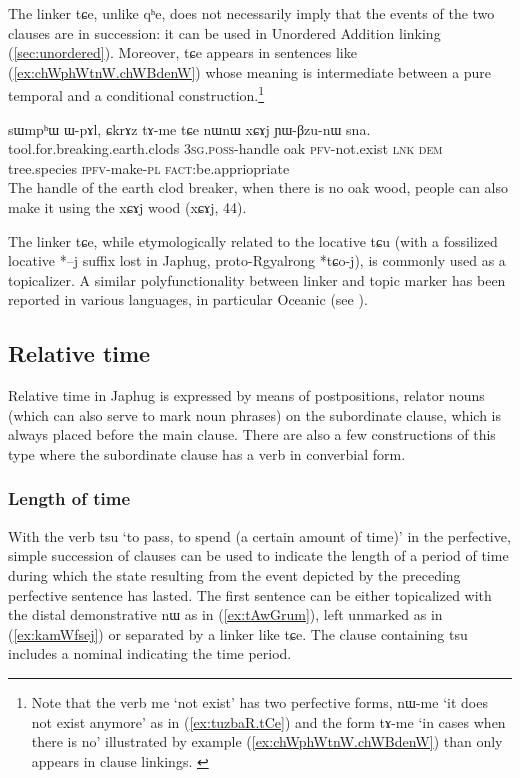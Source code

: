 \documentclass[oldfontcommands,oneside,a4paper,11pt]{article}
\newcommand{\ipa}[1]{{\phon \mbox{#1}}} %
\newcommand{\refb}[1]{(\ref{#1})}
\begin{document}
 The linker \ipa{tɕe}, unlike \ipa{qʰe},  does not necessarily imply that the events of the two clauses are in succession: it can be used in Unordered Addition linking \refb{sec:unordered}. Moreover,  \ipa{tɕe}  appears in sentences like \refb{ex:chWphWtnW.chWBdenW} whose meaning is intermediate between a pure temporal and a conditional construction.\footnote{Note that the verb \ipa{me} `not exist' has two perfective forms,  \ipa{nɯ-me} `it does not exist anymore' as in \refb{ex:tuzbaR.tCe} and the   form \ipa{tɤ-me} `in cases when there is no' illustrated by example \refb{ex:chWphWtnW.chWBdenW} than only appears in clause linkings. \label{ft:tAme}}

\begin{exe}
\ex \label{ex:chWphWtnW.chWBdenW}
\gll 
   	\ipa{sɯmpʰɯ}  	\ipa{ɯ-pɤl,}  	\ipa{ɕkrɤz}  	\ipa{tɤ-me}  	\ipa{tɕe}  	\ipa{nɯnɯ}  	\ipa{xɕɤj}  	\ipa{ɲɯ-βzu-nɯ}  	\ipa{sna.}  \\
   	tool.for.breaking.earth.clods \textsc{3sg.poss}-handle oak \textsc{pfv}-not.exist \textsc{lnk} \textsc{dem} tree.species \textsc{ipfv}-make-\textsc{pl} \textsc{fact}:be.appriopriate \\
\glt The handle of the earth clod breaker, when there is no oak wood, people can also make it using the xɕɤj wood (xɕɤj, 44).
\end{exe}
 
 The linker \ipa{tɕe}, while etymologically related to the locative \ipa{tɕu} (with a fossilized locative *\ipa{--j} suffix lost in Japhug, proto-Rgyalrong *\ipa{tɕo-j}), is commonly used as a topicalizer. A similar polyfunctionality between linker and topic marker has been reported in various languages, in particular Oceanic   (see  \citealt{bril10oceanic}).
  
\subsection{Relative time} \label{sec:relative.time}
Relative time in Japhug is expressed by means of postpositions, relator nouns (which can also serve to mark noun phrases) on the subordinate clause, which is always placed before the main clause. There are also a few constructions of this type where the subordinate clause has a verb in converbial form. 





 \subsubsection{Length of time}
With the verb \ipa{tsu} `to pass, to spend (a certain amount of time)' in the perfective, simple succession of clauses can be used to indicate the length of a period of time during which the state resulting from the event depicted by the preceding perfective sentence has lasted.  The first sentence can be either topicalized with the distal demonstrative \ipa{nɯ} as in \refb{ex:tAwGrum}, left unmarked as in \refb{ex:kamWfsej} or separated by a linker like \ipa{tɕe}. The clause containing \ipa{tsu} includes a nominal indicating the time period.
\end{document}
